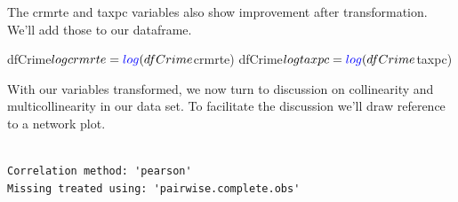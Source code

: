 \documentclass[]{article}
\newenvironment{Shaded}{}{}
\newcommand{\DataTypeTok}[1]{#1}
\newcommand{\DecValTok}[1]{#1}
\newcommand{\KeywordTok}[1]{\textcolor[rgb]{0.00,0.00,1.00}{#1}}
\newcommand{\NormalTok}[1]{#1}
\newcommand{\OperatorTok}[1]{#1}
\newcommand{\StringTok}[1]{\textcolor[rgb]{0.00,0.50,0.50}{#1}}
\begin{document}
The crmrte and taxpc variables also show improvement after
transformation. We'll add those to our dataframe.

\begin{Shaded}
\begin{Highlighting}[]
\NormalTok{dfCrime}\OperatorTok{$}\NormalTok{logcrmrte =}\StringTok{ }\KeywordTok{log}\NormalTok{(dfCrime}\OperatorTok{$}\NormalTok{crmrte)}
\NormalTok{dfCrime}\OperatorTok{$}\NormalTok{logtaxpc =}\StringTok{ }\KeywordTok{log}\NormalTok{(dfCrime}\OperatorTok{$}\NormalTok{taxpc)}
\end{Highlighting}
\end{Shaded}

With our variables transformed, we now turn to discussion on
collinearity and multicollinearity in our data set. To facilitate the
discussion we'll draw reference to a network plot.

\begin{Shaded}
\end{Shaded}

\begin{verbatim}

Correlation method: 'pearson'
Missing treated using: 'pairwise.complete.obs'
\end{verbatim}
\end{document}
